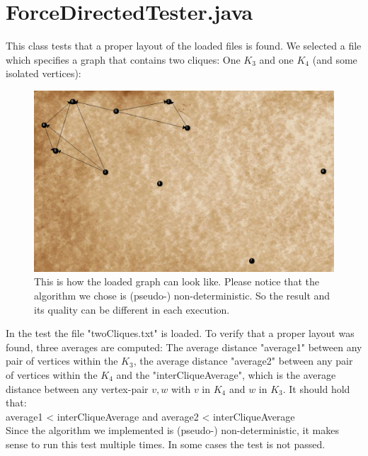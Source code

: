 \documentclass{article}
\begin{document}
\section{ForceDirectedTester.java}
This class tests that a proper layout of the loaded files is found. We selected a file which specifies a graph that contains two cliques: One $K_3$ and one $K_4$ (and some isolated vertices):
\begin{figure}[H]
	\includegraphics[width=\textwidth,keepaspectratio]{./img/forceDirected.pdf}
	\caption{This is how the loaded graph can look like. Please notice that the algorithm we chose is (pseudo-) non-deterministic. So the result and its quality can be different in each execution.}
\end{figure}
In the test the file "twoCliques.txt" is loaded. To verify that a proper layout was found, three averages are computed: The average distance "average1" between any pair of vertices within the $K_3$, the average distance "average2" between any pair of vertices within the $K_4$ and the "interCliqueAverage", which is the average distance between any vertex-pair $v,w$ with $v$ in $K_4$ and $w$ in $K_3$. It should hold that: \\
average1 < interCliqueAverage and average2 < interCliqueAverage \\
Since the algorithm we implemented is (pseudo-) non-deterministic, it makes sense to run this test multiple times. In some cases the test is not passed.
\end{document}
